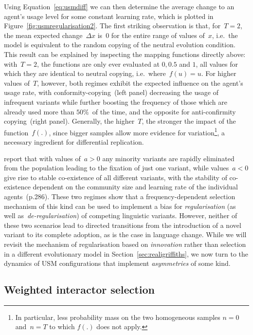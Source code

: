 Using Equation~\ref{eq:usmdiff} we can then determine the average change to an agent's usage level for some constant learning rate, which is plotted in Figure~\ref{fig:usmregularisation2}. The first striking observation is that, for~$T=2$, the mean expected change~$\Delta x$ is~0 for the entire range of values of~$x$, i.e.~the model is equivalent to the random copying of the neutral evolution condition. This result can be explained by inspecting the mapping functions directly above: with~$T=2$, the functions are only ever evaluated at $0, 0.5$ and $1$, all values for which they are identical to neutral copying, i.e.~where~$f(u)=u$. For higher values of~$T$, however, both regimes exhibit the expected influence on the agent's usage rate, with conformity-copying~(left panel) decreasing the usage of infrequent variants while further boosting the frequency of those which are already used more than $50\%$~of the time, and the opposite for anti-confirmity copying~(right panel). Generally, the higher~$T$, the stronger the impact of the function~$f(.)$, since bigger samples allow more evidence for variation\footnote{In particular, less probability mass on the two homogeneous samples $n=0$ and~$n=T$ to which $f(.)$ does not apply.}, a necessary ingredient for differential replication.

\citet{Blythe2012} report that with values of~$a>0$ any minority variants are rapidly eliminated from the population leading to the fixation of just one variant, while values~$a<0$ give rise to stable co-existence of all different variants, with the stability of co-existence dependent on the community size and learning rate of the individual agents~(p.286). These two regimes show that a frequency-dependent selection mechanism of this kind can be used to implement a bias for \emph{regularisation} (as well as~\emph{de-regularisation}) of competing linguistic variants. 
However, neither of these two scenarios lead to directed transitions from the introduction of a novel variant to its complete adoption, as is the case in language change. While we will revisit the mechanism of regularisation based on \emph{innovation} rather than selection in a different evolutionary model in Section~\ref{sec:realigriffiths}, we now turn to the dynamics of USM configurations that implement \emph{asymmetries} of some kind.

\subsection{Weighted interactor selection}\label{sec:usminteractorselection}

